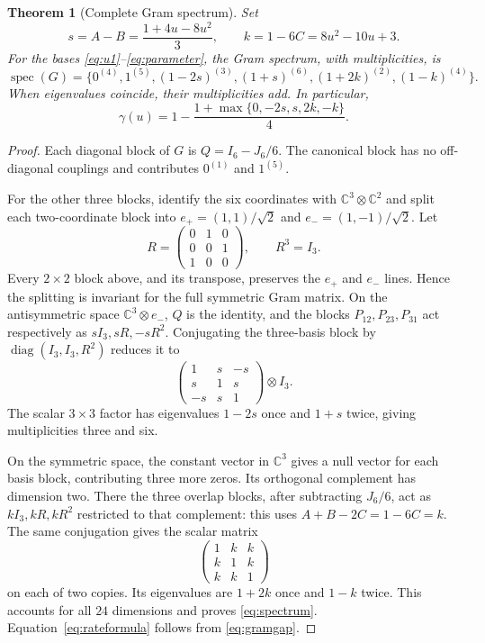 \documentclass[11pt,a4paper]{article}
\newtheorem{theorem}{Theorem}[section]
\theoremstyle{remark}
\DeclareMathOperator{\spec}{spec}
\DeclareMathOperator{\diag}{diag}
\newcommand{\C}{\mathbb C}
\begin{document}
\begin{theorem}[Complete Gram spectrum]\label{thm:spectrum}
Set
\begin{equation}\label{eq:sk}
 s=A-B=\frac{1+4u-8u^2}{3},\qquad
 k=1-6C=8u^2-10u+3.
\end{equation}
For the bases \eqref{eq:u1}--\eqref{eq:parameter}, the Gram spectrum, with multiplicities, is
\begin{equation}\label{eq:spectrum}
 \spec(G)=\{0^{(4)},1^{(5)},(1-2s)^{(3)},(1+s)^{(6)},
                       (1+2k)^{(2)},(1-k)^{(4)}\}.
\end{equation}
When eigenvalues coincide, their multiplicities add. In particular,
\begin{equation}\label{eq:rateformula}
 \gamma(u)=1-\frac{1+\max\{0,-2s,s,2k,-k\}}4.
\end{equation}
\end{theorem}
\begin{proof}
Each diagonal block of $G$ is $Q=I_6-J_6/6$. The canonical block has no off-diagonal couplings and contributes $0^{(1)}$ and $1^{(5)}$.

For the other three blocks, identify the six coordinates with $\C^3\otimes\C^2$ and split each two-coordinate block into $e_+=(1,1)/\sqrt2$ and $e_-=(1,-1)/\sqrt2$. Let
\[
 R=\begin{pmatrix}0&1&0\\0&0&1\\1&0&0\end{pmatrix},\qquad R^3=I_3.
\]
Every $2\times2$ block above, and its transpose, preserves the $e_+$ and $e_-$ lines. Hence the splitting is invariant for the full symmetric Gram matrix. On the antisymmetric space $\C^3\otimes e_-$, $Q$ is the identity, and the blocks $P_{12},P_{23},P_{31}$ act respectively as $sI_3,sR,-sR^2$. Conjugating the three-basis block by $\diag(I_3,I_3,R^2)$ reduces it to
\[
 \begin{pmatrix}1&s&-s\\s&1&s\\-s&s&1\end{pmatrix}\otimes I_3.
\]
The scalar $3\times3$ factor has eigenvalues $1-2s$ once and $1+s$ twice, giving multiplicities three and six.

On the symmetric space, the constant vector in $\C^3$ gives a null vector for each basis block, contributing three more zeros. Its orthogonal complement has dimension two. There the three overlap blocks, after subtracting $J_6/6$, act as $kI_3,kR,kR^2$ restricted to that complement: this uses $A+B-2C=1-6C=k$. The same conjugation gives the scalar matrix
\[
 \begin{pmatrix}1&k&k\\k&1&k\\k&k&1\end{pmatrix}
\]
on each of two copies. Its eigenvalues are $1+2k$ once and $1-k$ twice. This accounts for all $24$ dimensions and proves \eqref{eq:spectrum}. Equation~\eqref{eq:rateformula} follows from \eqref{eq:gramgap}.
\end{proof}
\end{document}

